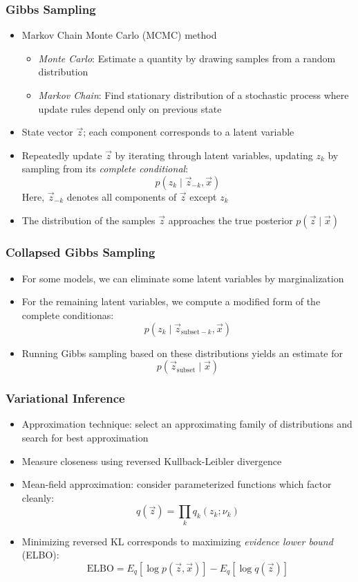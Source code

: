 \begin{frame}
\frametitle{Gibbs Sampling}
\begin{itemize}[<+->]
\item Markov Chain Monte Carlo (MCMC) method
    \begin{itemize}[<+->]
    \item \emph{Monte Carlo}: Estimate a quantity by drawing samples from a random distribution
    \item \emph{Markov Chain}: Find stationary distribution of a stochastic process where update rules depend only on previous state
    \end{itemize}
\item State vector $\vec z$; each component corresponds to a latent variable
\item Repeatedly update $\vec z$ by iterating through latent variables, updating $z_k$ by sampling from its \emph{complete conditional}:
\[ p(z_k \mid \vec z_{-k}, \vec x) \]
Here, $\vec z_{-k}$ denotes all components of $\vec z$ except $z_k$
\item The distribution of the samples $\vec z$ approaches the true posterior $p(\vec z \mid \vec x)$
\end{itemize}
\end{frame}

\begin{frame}
\frametitle{Collapsed Gibbs Sampling}
\begin{itemize}[<+->]
\item For some models, we can eliminate some latent variables by marginalization
\item For the remaining latent variables, we compute a modified form of the complete conditionas:
\[ p(z_k \mid \vec z_{\text{subset}-k}, \vec x) \]
\item Running Gibbs sampling based on these distributions yields an estimate for
\[ p(\vec z_{\text{subset}} \mid \vec x) \]
\end{itemize}
\end{frame}

\begin{frame}
\frametitle{Variational Inference}
\begin{itemize}[<+->]
\item Approximation technique: select an approximating family of distributions and search for best approximation
\item Measure closeness using reversed Kullback-Leibler divergence
\item Mean-field approximation: consider parameterized functions which factor cleanly:
\[ q(\vec z) = \prod_k q_k(z_k; \nu_k) \]
\item Minimizing reversed KL corresponds to maximizing \emph{evidence lower bound} (ELBO):
\[ \text{ELBO} = E_q[\log p(\vec z, \vec x)] - E_q[\log q(\vec z)] \]
\end{itemize}
\end{frame}

